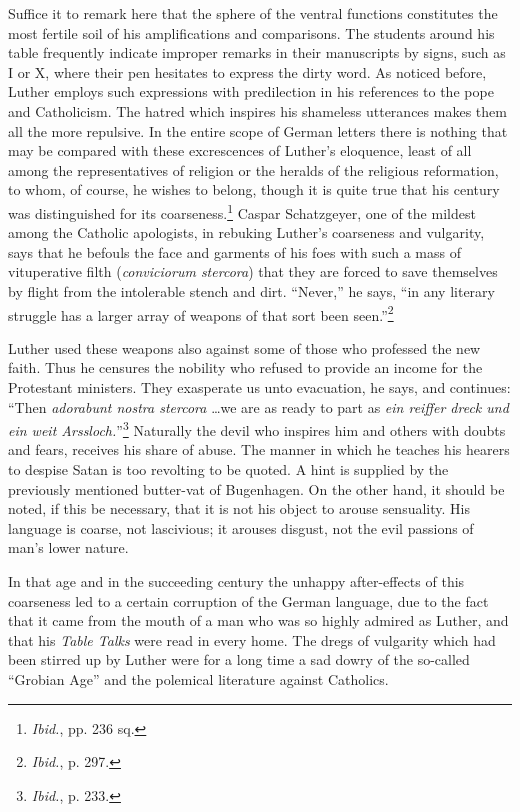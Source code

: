 Suffice it to remark here that the sphere of the ventral functions
constitutes the most fertile soil of his amplifications and comparisons.
The students around his table frequently indicate improper remarks
in their manuscripts by signs, such as I or X, where their pen hesitates
to express the dirty word. As noticed before, Luther employs such expressions
with predilection in his references to the pope and Catholicism. The hatred
which inspires his shameless utterances makes them
all the more repulsive. In the entire scope of German letters there is
nothing that may be compared with these excrescences of Luther’s
eloquence, least of all among the representatives of religion or the
heralds of the religious reformation, to whom, of course, he wishes to
belong, though it is quite true that his century was distinguished for
its coarseness.\footnote{\textit{Ibid.}, pp. 236 sq.}
 Caspar Schatzgeyer, one of the mildest among the
Catholic apologists, in rebuking Luther’s coarseness and vulgarity,
says that he befouls the face and garments of his foes with such a mass
of vituperative filth (\textit{conviciorum stercora}) that they are forced to
save themselves by flight from the intolerable stench and dirt.
“Never,” he says, “in any literary struggle has a larger array of
weapons of that sort been seen.”\footnote{\textit{Ibid.}, p. 297.}

Luther used these weapons also against some of those who professed
the new faith. Thus he censures the nobility who refused to provide
an income for the Protestant ministers. They exasperate us unto
evacuation, he says, and continues: “Then \textit{adorabunt nostra stercora}
\dots we are as ready to part as \textit{ein reiffer dreck und ein weit
Arssloch.}”\footnote{\textit{Ibid.}, p. 233.}
Naturally the devil who inspires him and others with
doubts and fears, receives his share of abuse. The manner in which
he teaches his hearers to despise Satan is too revolting to be quoted.
A hint is supplied by the previously mentioned butter-vat of Bugenhagen.
On the other hand, it should be noted, if this be necessary, that
it is not his object to arouse sensuality. His language is coarse, not
lascivious; it arouses disgust, not the evil passions of man’s lower
nature.

In that age and in the succeeding century the unhappy after-effects
of this coarseness led to a certain corruption of the German
language, due to the fact that it came from the mouth of a man who
was so highly admired as Luther, and that his \textit{Table Talks} were read
in every home. The dregs of vulgarity which had been stirred up by
Luther were for a long time a sad dowry of the so-called “Grobian
Age” and the polemical literature against Catholics.
